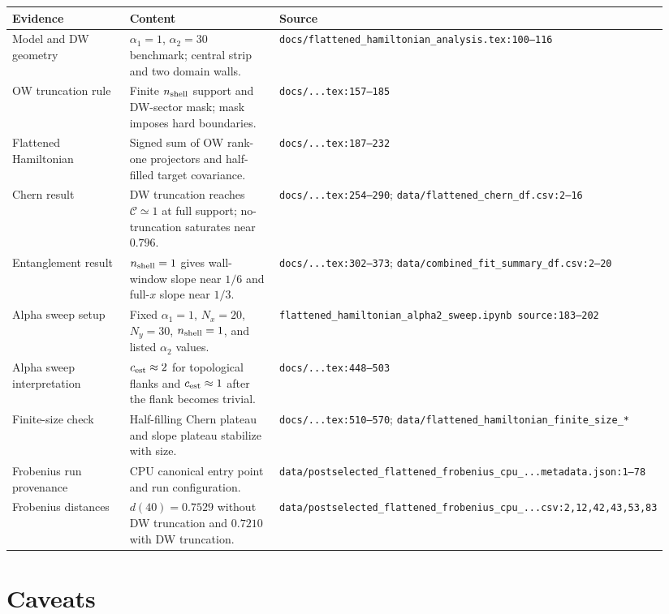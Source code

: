 \documentclass[aps,prb,onecolumn,nofootinbib,superscriptaddress]{revtex4-2}
\begin{document}
\begin{center}
\begin{tabular}{p{0.33\linewidth}p{0.45\linewidth}p{0.16\linewidth}}
\toprule
Evidence & Content & Source \\
\midrule
Model and DW geometry & $\alpha_1=1$, $\alpha_2=30$ benchmark; central strip and two domain walls. & \texttt{docs/flattened\_hamiltonian\_analysis.tex:100--116} \\
OW truncation rule & Finite $n_{\rm shell}$ support and DW-sector mask; mask imposes hard boundaries. & \texttt{docs/...tex:157--185} \\
Flattened Hamiltonian & Signed sum of OW rank-one projectors and half-filled target covariance. & \texttt{docs/...tex:187--232} \\
Chern result & DW truncation reaches $\mathcal C\simeq1$ at full support; no-truncation saturates near $0.796$. & \texttt{docs/...tex:254--290}; \texttt{data/flattened\_chern\_df.csv:2--16} \\
Entanglement result & $n_{\rm shell}=1$ gives wall-window slope near $1/6$ and full-$x$ slope near $1/3$. & \texttt{docs/...tex:302--373}; \texttt{data/combined\_fit\_summary\_df.csv:2--20} \\
Alpha sweep setup & Fixed $\alpha_1=1$, $N_x=20$, $N_y=30$, $n_{\rm shell}=1$, and listed $\alpha_2$ values. & \texttt{flattened\_hamiltonian\_alpha2\_sweep.ipynb source:183--202} \\
Alpha sweep interpretation & $c_{\rm est}\approx2$ for topological flanks and $c_{\rm est}\approx1$ after the flank becomes trivial. & \texttt{docs/...tex:448--503} \\
Finite-size check & Half-filling Chern plateau and slope plateau stabilize with size. & \texttt{docs/...tex:510--570}; \texttt{data/flattened\_hamiltonian\_finite\_size\_*} \\
Frobenius run provenance & CPU canonical entry point and run configuration. & \texttt{data/postselected\_flattened\_frobenius\_cpu\_...metadata.json:1--78} \\
Frobenius distances & $d(40)=0.7529$ without DW truncation and $0.7210$ with DW truncation. & \texttt{data/postselected\_flattened\_frobenius\_cpu\_...csv:2,12,42,43,53,83} \\
\bottomrule
\end{tabular}
\end{center}

\section{Caveats}
\end{document}
